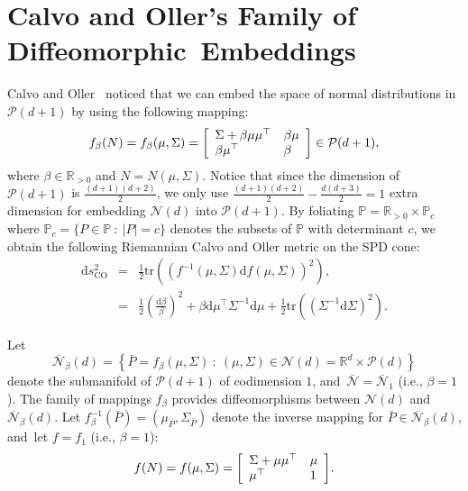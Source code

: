 \documentclass[entropy,article,accept,oneauthor,pdftex,entropy]{Definitions/mdpi}
\def\bbP{\mathbb{P}}
\def\barN{{\overline{\mathcal{N}}}}
\def\CO{\mathrm{CO}}
\def\bbR{\mathbb{R}}
\def\mattwotwo#1#2#3#4{{\left[\begin{array}{ll}#1 & #2\cr #3 & #4\end{array}\right]}}
\def\tr{\mathrm{tr}}
\def\calN{\mathcal{N}}
\def\calP{\mathcal{P}}
\def\dbeta{\mathrm{d}\beta}
\def\barP{{\bar P}}
\def\dSigma{\mathrm{d}\Sigma}
\def\dmu{\mathrm{d}\mu}
\def\ds{\mathrm{d}s}
\def\st{\ :\ }
\def\bbR{\mathbb{R}}
\begin{document}
\section{Calvo and Oller's Family of Diffeomorphic~Embeddings}\label{sec:CO}
Calvo and Oller~\cite{SDPMVN-1990,SDPElliptical-2002} noticed that we can  embed the space of normal distributions in $\calP(d+1)$ by  using the following   mapping:
\begin{equation}
f_{\beta}(N)=f_{\beta}(\mu,\Sigma)=
  \mattwotwo{\Sigma+\beta\mu\mu^\top}{\beta\mu}{\beta\mu^\top}{\beta}\in\calP(d+1),
\end{equation}
where $\beta\in\bbR_{>0}$ and $N=N(\mu,\Sigma)$.
Notice that since the dimension of $\calP(d+1)$ is $\frac{(d+1)(d+2)}{2}$, we only use $\frac{(d+1)(d+2)}{2}-\frac{d(d+3)}{2}=1$ extra dimension for embedding $\calN(d)$ into $\calP(d+1)$. 
By foliating $\bbP=\bbR_{>0}\times \bbP_c$ where $\bbP_c=\{P\in\bbP\st |P|=c\}$ denotes the subsets of $\bbP$ with determinant $c$, we obtain the following Riemannian Calvo and Oller metric on the SPD cone:
\begin{eqnarray*}
\ds^2_\CO &=& \frac{1}{2}\tr\left(\left(f^{-1}(\mu,\Sigma)\mathrm{d}f(\mu,\Sigma)\right)^2\right),\\
&=& \frac{1}{2}\left(\frac{\dbeta}{\beta}\right)^2 + \beta\dmu^\top \Sigma^{-1}\dmu+\frac{1}{2}\tr\left(\left(\Sigma^{-1}\dSigma\right)^2\right).
\end{eqnarray*}


Let 
$$
\barN_\beta(d) = \left\{\barP=f_{\beta}(\mu,\Sigma) \st (\mu,\Sigma)\in \calN(d)=\bbR^d\times\calP(d)\right\}
$$
 denote the submanifold of $\calP(d+1)$ of codimension $1$, and~$\barN=\barN_1$ (i.e., $\beta=1$). 
The family of mappings $f_{\beta}$ provides diffeomorphisms between $\calN(d)$ and $\barN_\beta(d)$. 
Let $f_{\beta}^{-1}(\barP)=(\mu_\barP,\Sigma_\barP)$ denote the inverse mapping for $\barP\in\barN_\beta(d)$, and~let $f=f_1$ (i.e., $\beta=1$): 
$$
f(N)=f(\mu,\Sigma)=\mattwotwo{\Sigma+\mu\mu^\top}{\mu}{\mu^\top}{1}.
$$
\end{document}
